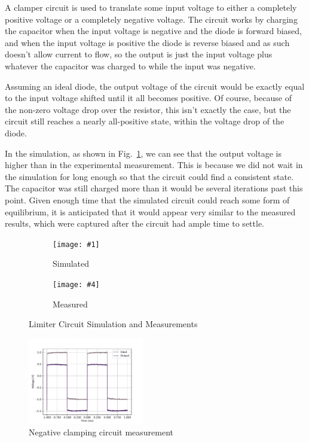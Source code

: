 \documentclass{../../ece-report}
\newcommand{\twosubfigures}[6]{
  \begin{subfigure}{0.45\textwidth}
    \texttt{[image: \#1]}
    \caption{#2}
    \label{#3}
  \end{subfigure}
  \begin{subfigure}{0.45\textwidth}
    \texttt{[image: \#4]}
    \caption{#5}
    \label{#6}
  \end{subfigure}
}
\begin{document}
A clamper circuit is used to translate some input voltage
to either a completely positive voltage or a completely
negative voltage. The circuit works by charging the
capacitor when the input voltage is negative and the
diode is forward biased, and when the input voltage
is positive the diode is reverse biased and as such
doesn't allow current to flow, so the output is just
the input voltage plus whatever the capacitor was charged
to while the input was negative. 

Assuming an ideal diode, the output voltage of the circuit
would be exactly equal to the input voltage shifted
until it all becomes positive. Of course, because of
the non-zero voltage drop over the resistor, this isn't
exactly the case, but the circuit still reaches a nearly
all-positive state, within the voltage drop of the diode.

In the simulation, as shown in Fig.~\ref{fig:c_simulated},
we can see that the output voltage is higher than in
the experimental measurement. This is because we did
not wait in the simulation for long enough so that the
circuit could find a consistent state. The capacitor
was still charged more than it would be several iterations
past this point. Given enough time that the simulated
circuit could reach some form of equilibrium, it is
anticipated that it would appear very similar to the
measured results, which were captured after the circuit
had ample time to settle.

\begin{figure}[h!]
  \centering
  \twosubfigures{../plots/circuit_c/pdf/c_sim_trans.pdf}{Simulated}{fig:c_simulated}
                {../plots/circuit_c/pdf/c_meas_trans.pdf}{Measured}{fig:c_measured}
  \caption{Limiter Circuit Simulation and Measurements}
  \label{fig:clamped_results}
\end{figure}

\begin{figure}[h!]
  \centering
  \includegraphics[width=0.45\textwidth]{../plots/circuit_c/pdf/c_meas_-0_7.pdf}
  \caption{Negative clamping circuit measurement}
  \label{fig:negative_clamped_results}
\end{figure}
\end{document}

